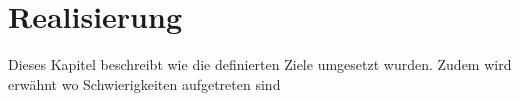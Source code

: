 \chapter{Realisierung}


Dieses Kapitel beschreibt wie die definierten Ziele umgesetzt wurden.
Zudem wird erwähnt wo Schwierigkeiten aufgetreten sind 

%
%
%
%
%
%
%
